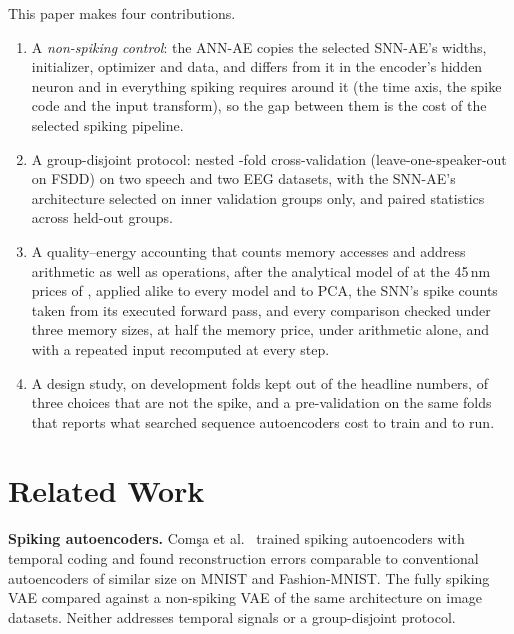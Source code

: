 \documentclass[conference]{IEEEtran}
\begin{document}
\par This paper makes four contributions.
\begin{enumerate}
  \item A \emph{non-spiking control}: the ANN-AE copies the selected SNN-AE's widths,
        initializer, optimizer and data, and differs from it in the encoder's hidden neuron and
        in everything spiking requires around it (the time axis, the spike code and the input
        transform), so the gap between them is the cost of the selected spiking pipeline.
  \item A group-disjoint protocol: nested \cfgFolds-fold cross-validation (leave-one-speaker-out
        on FSDD) on two speech and two EEG datasets, with the SNN-AE's architecture selected on
        inner validation groups only, and paired statistics across held-out groups.
  \item A quality--energy accounting that counts memory accesses and address arithmetic as
        well as operations, after the analytical model of \cite{lemaire2022analytical} at the
        45\,nm prices of \cite{horowitz2014computing}, applied alike to every model and to PCA,
        the SNN's spike counts taken from its executed forward pass, and every comparison checked
        under three memory sizes, at half the memory price, under arithmetic alone, and with a
        repeated input recomputed at every step.
  \item A design study, on development folds kept out of the headline numbers, of three choices
        that are not the spike, and a pre-validation on the same folds that reports what searched
        sequence autoencoders cost to train and to run.
\end{enumerate}

\section{Related Work}

\par \textbf{Spiking autoencoders.} Comşa et al.\ \cite{comsa2021spiking} trained spiking
autoencoders with temporal coding and found reconstruction errors comparable to
conventional autoencoders of similar size on MNIST and Fashion-MNIST. The fully spiking VAE
\cite{kamata2022fully} compared against a non-spiking VAE of the same architecture on image
datasets. Neither addresses temporal signals or a group-disjoint protocol.
\end{document}
